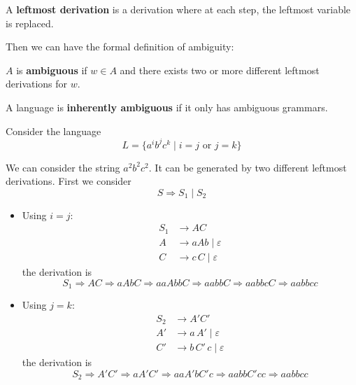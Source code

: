 \begin{definition}
    A \textbf{leftmost derivation} is a derivation where at each step, the leftmost variable is replaced.
\end{definition}

Then we can have the formal definition of ambiguity:

\begin{definition}[Ambiguous]
    $A$ is \textbf{ambiguous} if $w\in A$ and there exists two or more different leftmost derivations for $w$.
\end{definition}

\begin{definition}
    A language is \textbf{inherently ambiguous} if it only has ambiguous grammars.
\end{definition}

\begin{eg}
    Consider the language
    \[
    L = \{ a^i b^j c^k \mid i = j \text{ or } j = k \}
    \]
\end{eg}
We can consider the string $a^2 b^2 c^2$. It can be generated by two different leftmost derivations. First we consider $$S \Rightarrow S_1 \mid S_2$$
\begin{itemize}
    \item Using $i = j$:
    \begin{align*}
        S_1 &\to A C \\
        A &\to a A b \mid \varepsilon \\
        C &\to c\,C \mid \varepsilon
    \end{align*}
    the derivation is
    \[
    S_1 \Rightarrow AC \Rightarrow a A b C \Rightarrow a a A b b C \Rightarrow a a b b C \Rightarrow a a b b c C \Rightarrow a a b b c c
    \]
    \item Using $j = k$:
    \begin{align*}
        S_2 &\to A' C' \\
        A' &\to a\,A' \mid \varepsilon \\
        C' &\to b\,C'\,c \mid \varepsilon
    \end{align*}
    the derivation is
    \[
    S_2 \Rightarrow A' C' \Rightarrow a A' C' \Rightarrow a a A' b C' c \Rightarrow a a bb C' cc \Rightarrow a a bb  cc
    \]
\end{itemize}

\newpage